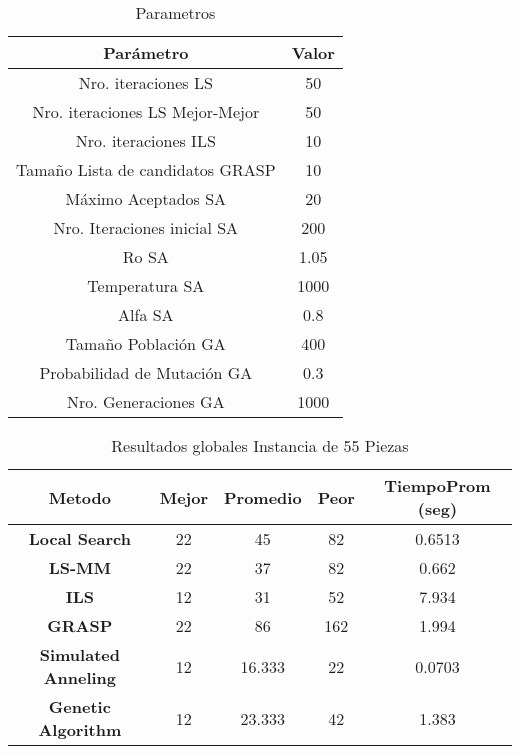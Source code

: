 \pagestyle{empty}


\begin{center}

\begin{table}
\centering
\begin{tabular}{|c|c|}
\hline
Par\'ametro & Valor \\
\hline
 Nro. iteraciones LS & 50 \\
\hline
 Nro. iteraciones LS Mejor-Mejor & 50 \\
\hline
 Nro. iteraciones ILS & 10 \\
\hline
 Tama\~no Lista de candidatos GRASP & 10 \\
\hline
 M\'aximo Aceptados SA & 20 \\
\hline
 Nro. Iteraciones inicial SA & 200\\
\hline
 Ro SA & 1.05\\
\hline
 Temperatura SA & 1000 \\
\hline
 Alfa SA & 0.8\\
\hline
 Tama\~no Poblaci\'on GA & 400\\
\hline
Probabilidad de Mutaci\'on GA & 0.3\\
\hline
 Nro. Generaciones GA & 1000\\
\hline

\end{tabular}
\caption{Parametros}
\end{table}

\begin{table}
\begin{tabular}{|c|c|c|c|c|}

\hline
{\bf Metodo} & {\bf Mejor} & {\bf Promedio} & {\bf Peor} & {\bf TiempoProm (seg)}\\
\hline
{\bf Local Search} & 22 & 45 &  82 & 0.6513\\
\hline
{\bf LS-MM} & 22 & 37 & 82 & 0.662\\
\hline
{\bf ILS} & 12 & 31 & 52 & 7.934\\
\hline
{\bf GRASP} & 22 & 86 & 162 & 1.994\\
\hline
{\bf Simulated Anneling} & 12 & 16.333 & 22 & 0.0703\\
\hline
{\bf Genetic Algorithm} & 12 & 23.333 & 42 & 1.383\\
\hline

\end{tabular}
\caption{Resultados globales Instancia de 55 Piezas}
\end{table}


\end{center}
